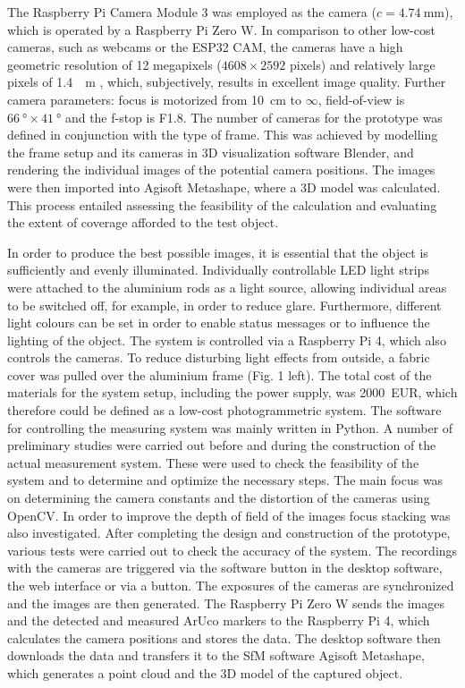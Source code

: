 \documentclass{isprs} %
\begin{document}
The Raspberry Pi Camera Module 3 was employed as the camera ($c = \SI{4.74}{\milli\metre}$), which is operated by a
Raspberry Pi Zero W. In comparison to other low-cost cameras, such as webcams or the ESP32 CAM, the
cameras have a high geometric resolution of 12 megapixels ($4608 \times 2592$ pixels) and relatively large pixels of \SI{1.4}{\mu\metre} \cite{raspicamdatasheet}, which, subjectively, results in excellent image quality. Further camera
parameters: focus is motorized from \SI{10}{\centi\metre} to $\infty$, field-of-view is $\SI{66}{\degree} \times \SI{41}{\degree}$ and the f-stop is F1.8. The number of cameras for the prototype was defined in conjunction with the type of frame. This was achieved by modelling the
frame setup and its cameras in 3D visualization software Blender, and rendering the individual images of the
potential camera positions. The images were then imported into Agisoft Metashape, where a 3D model was
calculated. This process entailed assessing the feasibility of the calculation and evaluating the extent of coverage
afforded to the test object.

In order to produce the best possible images, it is essential that the object is sufficiently and evenly illuminated.
Individually controllable LED light strips were attached to the aluminium rods as a light source, allowing
individual areas to be switched off, for example, in order to reduce glare. Furthermore, different light colours can
be set in order to enable status messages or to influence the lighting of the object. The system is controlled via a
Raspberry Pi 4, which also controls the cameras. To reduce disturbing light effects from outside, a fabric cover
was pulled over the aluminium frame (Fig. 1 left). The total cost of the materials for the system setup, including
the power supply, was \SI{2000}{EUR}, which therefore could be defined as a low-cost photogrammetric system.
The software for controlling the measuring system was mainly written in Python. A number of preliminary
studies were carried out before and during the construction of the actual measurement system. These were used
to check the feasibility of the system and to determine and optimize the necessary steps. The main focus was on
determining the camera constants and the distortion of the cameras using OpenCV. In order to improve the depth
of field of the images focus stacking was also investigated. After completing the design and construction of the
prototype, various tests were carried out to check the accuracy of the system.
The recordings with the cameras are triggered via the software button in the desktop software, the web interface
or via a button. The exposures of the cameras are synchronized and the images are then generated. The
Raspberry Pi Zero W sends the images and the detected and measured ArUco markers to the Raspberry Pi 4,
which calculates the camera positions and stores the data. The desktop software then downloads the data and
transfers it to the SfM software Agisoft Metashape, which generates a point cloud and the 3D model of the
captured object.
\end{document}
